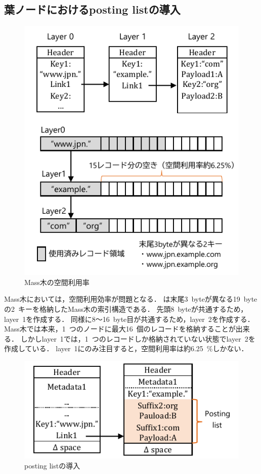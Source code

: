 \subsection{葉ノードにおけるposting listの導入}

\begin{figure}[t]
    \centering
    \includegraphics{./figures/mass_memory.pdf}
    \caption{Mass木の空間利用率}
    \label{fig:memory}
\end{figure}

Mass木においては，空間利用効率が問題となる．
\Fig{\ref{fig:memory}}は末尾3~byteが異なる19~byteの2~キーを格納したMass木の索引構造である．
先頭8~byteが共通するため，layer~1を作成する．
同様に8～16~byte目が共通するため，layer~2を作成する．
Mass木では本来，1~つのノードに最大16~個のレコードを格納することが出来る．
しかしlayer~1では，1~つのレコードしか格納されていない状態でlayer~2を作成している．
layer~1にのみ注目すると，空間利用率は約6.25~\%しかない．

\begin{figure}[t]
    \centering
    \includegraphics{./figures/posting_list.pdf}
    \caption{posting listの導入}
    \label{fig:posting_list}
\end{figure}

